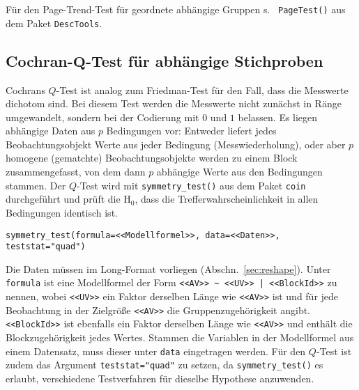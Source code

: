 Für den Page-Trend-Test für geordnete abhängige Gruppen s.\  \lstinline!PageTest()! aus dem Paket  \lstinline!DescTools!.

\subsection[Cochran-\texorpdfstring{$Q$}{Q}-Test für abhängige Stichproben]{Cochran-$\bm{Q}$-Test für abhängige Stichproben}
\label{sec:cochranQ}

Cochrans $Q$-Test ist analog zum Friedman-Test für den Fall, dass die Messwerte dichotom sind. Bei diesem Test werden die Messwerte nicht zunächst in Ränge umgewandelt, sondern bei der Codierung mit $0$ und $1$ belassen. Es liegen abhängige Daten aus $p$ Bedingungen vor: Entweder liefert jedes Beobachtungsobjekt Werte aus jeder Bedingung (Messwiederholung), oder aber $p$ homogene (gematchte) Beobachtungsobjekte werden zu einem Block zusammengefasst, von dem dann $p$ abhängige Werte aus den Bedingungen stammen. Der $Q$-Test wird mit \lstinline!symmetry_test()! aus dem Paket \lstinline!coin! durchgeführt und prüft die $\text{H}_{0}$, dass die Trefferwahrscheinlichkeit in allen Bedingungen identisch ist.
\begin{lstlisting}
symmetry_test(formula=<<Modellformel>>, data=<<Daten>>, teststat="quad")
\end{lstlisting}

Die Daten müssen im Long-Format vorliegen (Abschn.\ \ref{sec:reshape}). Unter \lstinline!formula! ist eine Modellformel der Form \lstinline!<<AV>> ~ <<UV>> | <<BlockId>>! zu nennen, wobei \lstinline!<<UV>>! ein Faktor derselben Länge wie \lstinline!<<AV>>! ist und für jede Beobachtung in der Zielgröße \lstinline!<<AV>>! die Gruppenzugehörigkeit angibt. \lstinline!<<BlockId>>! ist ebenfalls ein Faktor derselben Länge wie \lstinline!<<AV>>! und enthält die Blockzugehörigkeit jedes Wertes. Stammen die Variablen in der Modellformel aus einem Datensatz, muss dieser unter \lstinline!data! eingetragen werden. Für den $Q$-Test ist zudem das Argument \lstinline!teststat="quad"! zu setzen, da \lstinline!symmetry_test()! es erlaubt, verschiedene Testverfahren für dieselbe Hypothese anzuwenden.

